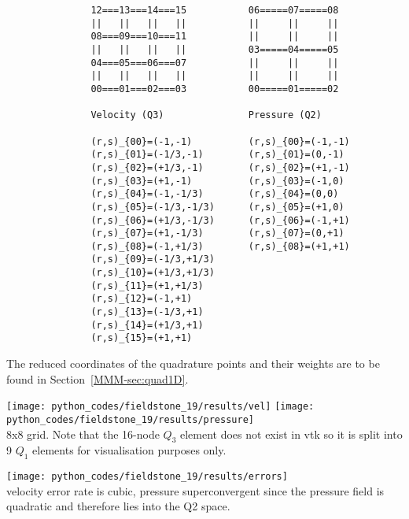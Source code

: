 \begin{verbatim}
               12===13===14===15           06=====07=====08
               ||   ||   ||   ||           ||     ||     ||
               08===09===10===11           ||     ||     ||
               ||   ||   ||   ||           03=====04=====05
               04===05===06===07           ||     ||     ||
               ||   ||   ||   ||           ||     ||     ||
               00===01===02===03           00=====01=====02

               Velocity (Q3)               Pressure (Q2)

               (r,s)_{00}=(-1,-1)          (r,s)_{00}=(-1,-1) 
               (r,s)_{01}=(-1/3,-1)        (r,s)_{01}=(0,-1) 
               (r,s)_{02}=(+1/3,-1)        (r,s)_{02}=(+1,-1) 
               (r,s)_{03}=(+1,-1)          (r,s)_{03}=(-1,0) 
               (r,s)_{04}=(-1,-1/3)        (r,s)_{04}=(0,0) 
               (r,s)_{05}=(-1/3,-1/3)      (r,s)_{05}=(+1,0) 
               (r,s)_{06}=(+1/3,-1/3)      (r,s)_{06}=(-1,+1) 
               (r,s)_{07}=(+1,-1/3)        (r,s)_{07}=(0,+1) 
               (r,s)_{08}=(-1,+1/3)        (r,s)_{08}=(+1,+1) 
               (r,s)_{09}=(-1/3,+1/3)
               (r,s)_{10}=(+1/3,+1/3)
               (r,s)_{11}=(+1,+1/3)
               (r,s)_{12}=(-1,+1)
               (r,s)_{13}=(-1/3,+1)
               (r,s)_{14}=(+1/3,+1)
               (r,s)_{15}=(+1,+1)
\end{verbatim}

The reduced coordinates of the quadrature points and their weights are to be found in 
Section~\ref{MMM-sec:quad1D}.

\begin{center}
\texttt{[image: python\_codes/fieldstone\_19/results/vel]}
\texttt{[image: python\_codes/fieldstone\_19/results/pressure]}\\
{\captionfont 8x8 grid. Note that the 16-node $Q_3$ element does not exist in vtk so it is split into 
9 $Q_1$ elements for visualisation purposes only.}
\end{center}

\begin{center}
\texttt{[image: python\_codes/fieldstone\_19/results/errors]}\\
{\captionfont velocity error rate is cubic, pressure superconvergent since the pressure field
is quadratic and therefore lies into the Q2 space.}
\end{center}

